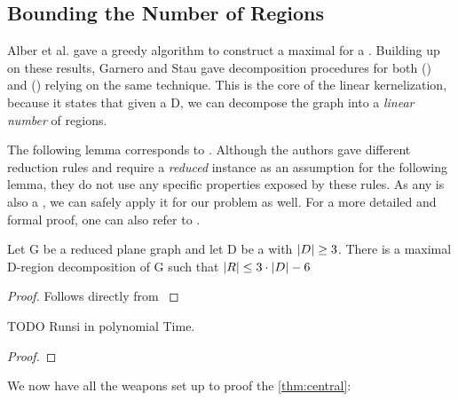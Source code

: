 

\subsection{Bounding the Number of Regions}

Alber et al. \cite[Proposition 1]{Alber2004} gave a greedy algorithm to construct a maximal \dreg for a \dom. Building up on these results, Garnero and Stau gave decomposition procedures for both \rbdom (\cite{Garnero2017a}) and \tdom (\cite{Garnero2018}) relying on the same technique. This is the core of the linear kernelization, because it states that given a \dom D, we can decompose the graph into a \textit{linear number} of regions.


The following lemma corresponds to \cite[Proposition 1 and Lemma 5]{Alber2004}. Although the authors gave different reduction rules and require a \textit{reduced} instance as an assumption for the following lemma, they do not use any specific properties exposed by these rules. 
As any \sdom is also a \dom, we can safely apply it for our problem as well. For a more detailed and formal proof, one can also refer to \cite[Proposition 1]{Garnero2018}.

\begin{lemma}\label{lemma:numRegions}
    Let G be a reduced plane graph and let D be a \sdom with $\abs{D}\geq 3$. There is a maximal D-region decomposition of G such that $\abs{R} \leq 3 \cdot \abs{D} - 6$
\end{lemma}
\begin{proof} 
    Follows directly from \cite[Proposition 1 and Lemma 5]{Alber2004}
\end{proof}


\begin{lemma}\label{lemma:runtime}
    TODO Runsi in polynomial Time. 
\end{lemma}
\begin{proof} 
\end{proof}

\noindent We now have all the weapons set up to proof the \cref{thm:central}: 

